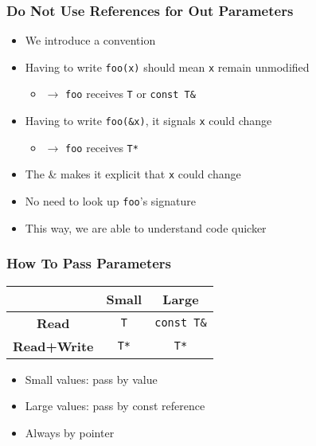 \begin{frame}
  \frametitle{Do Not Use References for Out Parameters}
  \begin{itemize}
    \item We introduce a convention
    \item Having to write \texttt{foo(x)} should mean \texttt{x} remain unmodified
          \begin{itemize}
            \item $\rightarrow$ \texttt{foo} receives \texttt{T} or \texttt{const T\&}
          \end{itemize}
    \item Having to write \texttt{foo(\&x)}, it signals \texttt{x} could change
          \begin{itemize}
            \item $\rightarrow$ \texttt{foo} receives \texttt{T*}
          \end{itemize}
    \item The \& makes it explicit that \texttt{x} could change
    \item No need to look up \texttt{foo}'s signature
    \item This way, we are able to understand code quicker
  \end{itemize}
\end{frame}

\begin{frame}
  \frametitle{How To Pass Parameters}
  \begin{center}
    \begin{tabular}{ccc}
      & \textbf{Small} & \textbf{Large} \\
      \toprule
      \textbf{Read} & \texttt{T} & \texttt{const T\&} \\
      \textbf{Read+Write} & \texttt{T*} & \texttt{T*} \\
    \end{tabular}
  \end{center}
  \vskip4mm
  \begin{itemize}
    \item Small values: pass by value
    \item Large values: pass by const reference
  \end{itemize}
  \vskip4mm
  \begin{itemize}
    \item Always by pointer
  \end{itemize}
\end{frame}



